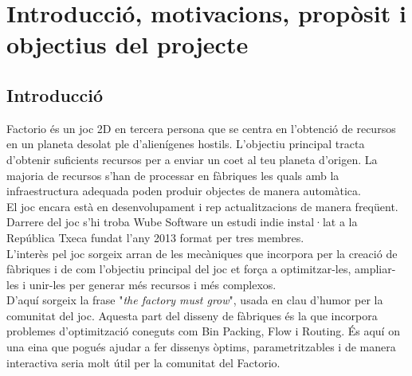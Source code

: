 


\chapter{Introducció, motivacions, propòsit i objectius del projecte} %

\label{Chapter1} %


\section{Introducció}
Factorio \cite{FactorioGame} és un joc 2D en tercera persona que se centra en l'obtenció de recursos en un planeta desolat ple d'alienígenes hostils. L'objectiu principal tracta d'obtenir suficients recursos per a enviar un coet al teu planeta d'origen. La majoria de recursos s'han de processar en fàbriques les quals amb la infraestructura adequada poden produir objectes de manera automàtica.\\

El joc encara està en desenvolupament i rep actualitzacions de manera freqüent. Darrere del joc s'hi troba Wube Software un estudi indie instal·lat a la República Txeca fundat l'any 2013 format per tres membres.\\

L'interès pel joc sorgeix arran de les mecàniques que incorpora per la creació de fàbriques i de com l'objectiu principal del joc et força a optimitzar-les, ampliar-les i unir-les per generar més recursos i més complexos.\\
D'aquí sorgeix la frase "\textit{the factory must grow}", usada en clau d'humor per la comunitat del joc. Aquesta part del disseny de fàbriques és la que incorpora problemes d'optimització coneguts com Bin Packing, Flow i Routing. És aquí on una eina que pogués ajudar a fer dissenys òptims, parametritzables i de manera interactiva seria molt útil per la comunitat del Factorio.\\

